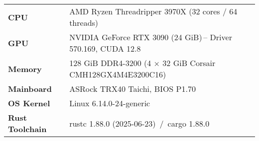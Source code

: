 \begin{tabular}{@{}ll@{}}
\toprule
\textbf{CPU}          & AMD Ryzen Threadripper 3970X (32 cores / 64 threads)\\
\textbf{GPU}          & NVIDIA GeForce RTX 3090 (24 GiB)\,– Driver 570.169, CUDA 12.8\\
\textbf{Memory}       & 128 GiB DDR4-3200 (4 × 32 GiB Corsair CMH128GX4M4E3200C16)\\
\textbf{Mainboard}    & ASRock TRX40 Taichi, BIOS P1.70\\
\textbf{OS Kernel}    & Linux 6.14.0-24-generic\\
\textbf{Rust Toolchain} & rustc 1.88.0 (2025-06-23)\, /\, cargo 1.88.0\\
\bottomrule
\end{tabular}
